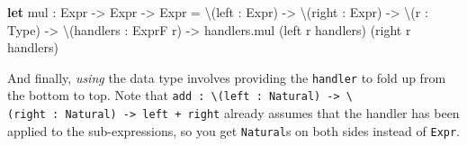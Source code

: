 \documentclass[]{article}
\newenvironment{Shaded}{}{}
\newcommand{\CommentTok}[1]{\textcolor[rgb]{0.38,0.63,0.69}{\textit{#1}}}
\newcommand{\KeywordTok}[1]{\textcolor[rgb]{0.00,0.44,0.13}{\textbf{#1}}}
\newcommand{\NormalTok}[1]{#1}
\newcommand{\OperatorTok}[1]{\textcolor[rgb]{0.40,0.40,0.40}{#1}}
\begin{document}
\begin{Shaded}
\begin{Highlighting}[]
\KeywordTok{let}\CommentTok{ }\NormalTok{mul}\CommentTok{ }\NormalTok{:}\CommentTok{ }\NormalTok{Expr}\CommentTok{ }\OperatorTok{{-}\textgreater{}}\CommentTok{ }\NormalTok{Expr}\CommentTok{ }\OperatorTok{{-}\textgreater{}}\CommentTok{ }\NormalTok{Expr}
\CommentTok{      }\NormalTok{=}\CommentTok{ }\OperatorTok{\textbackslash{}}\NormalTok{(left}\CommentTok{ }\NormalTok{:}\CommentTok{ }\NormalTok{Expr)}\CommentTok{ }\OperatorTok{{-}\textgreater{}}
\CommentTok{        }\OperatorTok{\textbackslash{}}\NormalTok{(right}\CommentTok{ }\NormalTok{:}\CommentTok{ }\NormalTok{Expr)}\CommentTok{ }\OperatorTok{{-}\textgreater{}}
\CommentTok{        }\OperatorTok{\textbackslash{}}\NormalTok{(r}\CommentTok{ }\NormalTok{:}\CommentTok{ }\NormalTok{Type)}\CommentTok{ }\OperatorTok{{-}\textgreater{}}
\CommentTok{        }\OperatorTok{\textbackslash{}}\NormalTok{(handlers}\CommentTok{ }\NormalTok{:}\CommentTok{ }\NormalTok{ExprF}\CommentTok{ }\NormalTok{r)}\CommentTok{ }\OperatorTok{{-}\textgreater{}}
\CommentTok{            }\NormalTok{handlers.mul}\CommentTok{ }\NormalTok{(left}\CommentTok{ }\NormalTok{r}\CommentTok{ }\NormalTok{handlers)}\CommentTok{ }\NormalTok{(right}\CommentTok{ }\NormalTok{r}\CommentTok{ }\NormalTok{handlers)}
\end{Highlighting}
\end{Shaded}

And finally, \emph{using} the data type involves providing the \texttt{handler}
to fold up from the bottom to top. Note that
\texttt{add\ :\ \textbackslash{}(left\ :\ Natural)\ -\textgreater{}\ \textbackslash{}(right\ :\ Natural)\ -\textgreater{}\ left\ +\ right}
already assumes that the handler has been applied to the sub-expressions, so you
get \texttt{Natural}s on both sides instead of \texttt{Expr}.
\end{document}
